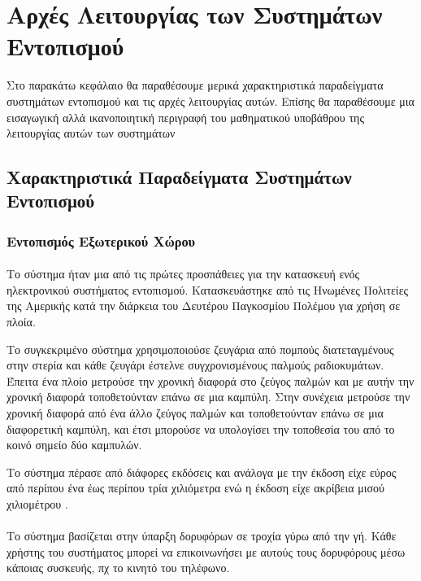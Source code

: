 \chapter{Αρχές Λειτουργίας των Συστημάτων Εντοπισμού}
Στο παρακάτω κεφάλαιο θα παραθέσουμε μερικά χαρακτηριστικά παραδείγματα συστημάτων εντοπισμού και τις αρχές λειτουργίας αυτών.
Επίσης θα παραθέσουμε μια εισαγωγική αλλά ικανοποιητική περιγραφή του μαθηματικού υποβάθρου της λειτουργίας αυτών των συστημάτων

\section{Χαρακτηριστικά Παραδείγματα Συστημάτων Εντοπισμού}
\subsection{Εντοπισμός Εξωτερικού Χώρου}
\subsubsection{}
Το σύστημα  ήταν μια από τις πρώτες προσπάθειες για την κατασκευή ενός ηλεκτρονικού συστήματος εντοπισμού.
Κατασκευάστηκε από τις Ηνωμένες Πολιτείες της Αμερικής κατά την διάρκεια του Δευτέρου Παγκοσμίου Πολέμου για χρήση σε πλοία.

Το συγκεκριμένο σύστημα χρησιμοποιούσε ζευγάρια από πομπούς διατεταγμένους στην στερία και κάθε ζευγάρι έστελνε συγχρονισμένους παλμούς ραδιοκυμάτων.
Έπειτα ένα πλοίο μετρούσε την χρονική διαφορά στο ζεύγος παλμών και με αυτήν την χρονική διαφορά τοποθετούνταν επάνω σε μια καμπύλη.
Στην συνέχεια μετρούσε την χρονική διαφορά από ένα άλλο ζεύγος παλμών και τοποθετούνταν επάνω σε μια διαφορετική καμπύλη, και έτσι μπορούσε να
υπολογίσει την τοποθεσία του από το κοινό σημείο δύο καμπυλών.

Το σύστημα  πέρασε από διάφορες εκδόσεις και ανάλογα με την έκδοση είχε εύρος από περίπου ένα έως περίπου τρία χιλιόμετρα ενώ η έκδοση  είχε ακρίβεια μισού χιλιομέτρου \cite{loran}.
\subsubsection{}
Το σύστημα  βασίζεται στην ύπαρξη δορυφόρων σε τροχία γύρω από την γή. Κάθε χρήστης του συστήματος μπορεί να επικοινωνήσει με αυτούς τους δορυφόρους μέσω κάποιας συσκευής, πχ το κινητό του τηλέφωνο.

